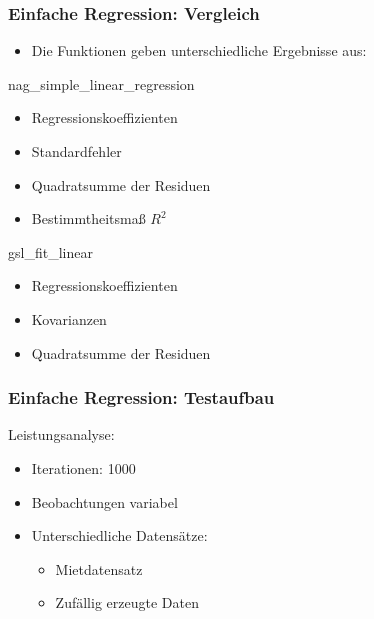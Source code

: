 \documentclass{beamer}
\begin{document}
\begin{frame}
  \frametitle{Einfache Regression: Vergleich}
  
  \begin{itemize}
  \item Die Funktionen geben unterschiedliche Ergebnisse aus:
  \end{itemize}

  \begin{block}{nag\_simple\_linear\_regression}
    \begin{itemize}
    \item Regressionskoeffizienten
    \item Standardfehler
    \item Quadratsumme der Residuen
    \item Bestimmtheitsmaß $R^2$
    \end{itemize}
  \end{block}

  \begin{block}{gsl\_fit\_linear}
    \begin{itemize}
    \item Regressionskoeffizienten
    \item Kovarianzen
    \item Quadratsumme der Residuen
    \end{itemize}
  \end{block}

\end{frame}

\begin{frame}
  \frametitle{Einfache Regression: Testaufbau}

  \begin{block}{Leistungsanalyse:}
    \begin{itemize}
    \item Iterationen: 1000
    \item Beobachtungen variabel
    \item Unterschiedliche Datensätze:
      \begin{itemize}
      \item Mietdatensatz
      \item Zufällig erzeugte Daten
      \end{itemize}
    \end{itemize}
  \end{block}

\end{frame}
\end{document}
